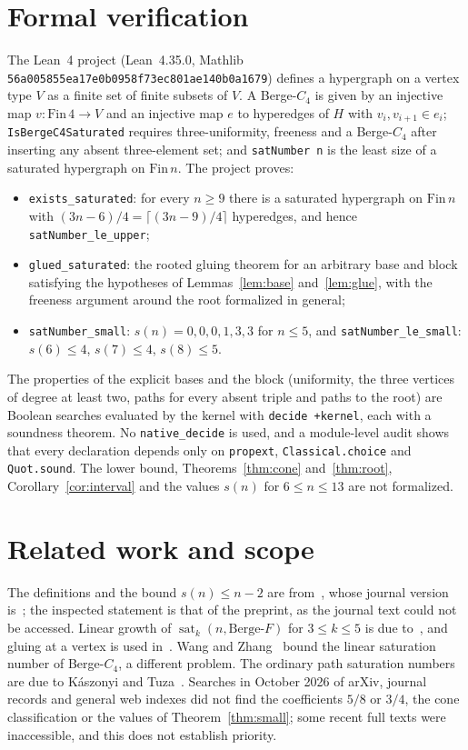 \documentclass[11pt]{article}
\theoremstyle{remark}
\newcommand{\sat}{\operatorname{sat}}
\begin{document}
\section{Formal verification}\label{sec:lean}

The Lean~4 project (Lean~4.35.0, Mathlib
\texttt{56a005855ea17e0b0958f73ec801ae140b0a1679}) defines a hypergraph
on a vertex type $V$ as a finite set of finite subsets of $V$. A
Berge-$C_4$ is given by an injective map $v:\mathrm{Fin}\,4\to V$ and an
injective map $e$ to hyperedges of $H$ with $v_i,v_{i+1}\in e_i$;
\texttt{IsBergeC4Saturated} requires three-uniformity, freeness and a
Berge-$C_4$ after inserting any absent three-element set; and
\texttt{satNumber n} is the least size of a saturated hypergraph on
$\mathrm{Fin}\,n$. The project proves:
\begin{itemize}
\item \texttt{exists\_saturated}: for every $n\ge9$ there is a saturated
hypergraph on $\mathrm{Fin}\,n$ with $(3n-6)/4=\lceil(3n-9)/4\rceil$
hyperedges, and hence \texttt{satNumber\_le\_upper};
\item \texttt{glued\_saturated}: the rooted gluing theorem for an
arbitrary base and block satisfying the hypotheses of
Lemmas~\ref{lem:base} and~\ref{lem:glue}, with the freeness argument
around the root formalized in general;
\item \texttt{satNumber\_small}: $s(n)=0,0,0,1,3,3$ for $n\le5$, and
\texttt{satNumber\_le\_small}: $s(6)\le4$, $s(7)\le4$, $s(8)\le5$.
\end{itemize}
The properties of the explicit bases and the block (uniformity, the
three vertices of degree at least two, paths for every absent triple and
paths to the root) are Boolean searches evaluated by the kernel with
\texttt{decide +kernel}, each with a soundness theorem. No
\texttt{native\_decide} is used, and a module-level audit shows that every
declaration depends only on \texttt{propext}, \texttt{Classical.choice}
and \texttt{Quot.sound}. The lower bound, Theorems~\ref{thm:cone}
and~\ref{thm:root}, Corollary~\ref{cor:interval} and the values
$s(n)$ for $6\le n\le13$ are not formalized.

\section{Related work and scope}\label{sec:related}

The definitions and the bound $s(n)\le n-2$ are from~\cite{EGKMS}, whose
journal version is~\cite{EGKMS-J}; the inspected statement is that of the
preprint, as the journal text could not be accessed. Linear growth of
$\sat_k(n,\text{Berge-}F)$ for $3\le k\le5$ is due to~\cite{EGMT}, and
gluing at a vertex is used in~\cite{EGKMS}. Wang and Zhang~\cite{WZ} bound the
linear saturation number of Berge-$C_4$, a different problem. The ordinary
path saturation numbers are due to K\'aszonyi and Tuza~\cite{KT}. Searches
in October 2026 of arXiv, journal records and general web indexes did not
find the coefficients $5/8$ or $3/4$, the cone classification or the
values of Theorem~\ref{thm:small}; some recent full texts were
inaccessible, and this does not establish priority.
\end{document}
